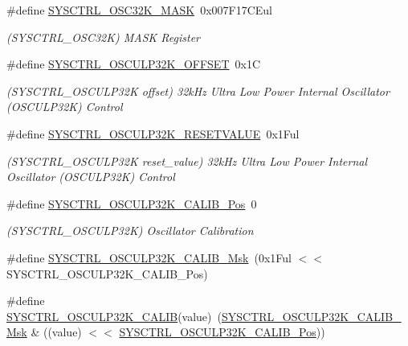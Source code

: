 \begin{DoxyCompactItemize}
\item 
\#define \mbox{\hyperlink{group___s_a_m_d21___s_y_s_c_t_r_l_ga91c37d1e1d85628f478db3078a687fdf}{S\+Y\+S\+C\+T\+R\+L\+\_\+\+O\+S\+C32\+K\+\_\+\+M\+A\+SK}}~0x007\+F17\+C\+Eul
\begin{DoxyCompactList}\small\item\em (S\+Y\+S\+C\+T\+R\+L\+\_\+\+O\+S\+C32K) M\+A\+SK Register \end{DoxyCompactList}\item 
\#define \mbox{\hyperlink{group___s_a_m_d21___s_y_s_c_t_r_l_ga3b2c2ce712e3ed40c83019159fac5023}{S\+Y\+S\+C\+T\+R\+L\+\_\+\+O\+S\+C\+U\+L\+P32\+K\+\_\+\+O\+F\+F\+S\+ET}}~0x1C
\begin{DoxyCompactList}\small\item\em (S\+Y\+S\+C\+T\+R\+L\+\_\+\+O\+S\+C\+U\+L\+P32K offset) 32k\+Hz Ultra Low Power Internal Oscillator (O\+S\+C\+U\+L\+P32K) Control \end{DoxyCompactList}\item 
\#define \mbox{\hyperlink{group___s_a_m_d21___s_y_s_c_t_r_l_ga0fb7cbf4784633291d2add8f2381771e}{S\+Y\+S\+C\+T\+R\+L\+\_\+\+O\+S\+C\+U\+L\+P32\+K\+\_\+\+R\+E\+S\+E\+T\+V\+A\+L\+UE}}~0x1\+Ful
\begin{DoxyCompactList}\small\item\em (S\+Y\+S\+C\+T\+R\+L\+\_\+\+O\+S\+C\+U\+L\+P32K reset\+\_\+value) 32k\+Hz Ultra Low Power Internal Oscillator (O\+S\+C\+U\+L\+P32K) Control \end{DoxyCompactList}\item 
\#define \mbox{\hyperlink{group___s_a_m_d21___s_y_s_c_t_r_l_ga404b197f963e0a9276bce0dbc3226207}{S\+Y\+S\+C\+T\+R\+L\+\_\+\+O\+S\+C\+U\+L\+P32\+K\+\_\+\+C\+A\+L\+I\+B\+\_\+\+Pos}}~0
\begin{DoxyCompactList}\small\item\em (S\+Y\+S\+C\+T\+R\+L\+\_\+\+O\+S\+C\+U\+L\+P32K) Oscillator Calibration \end{DoxyCompactList}\item 
\#define \mbox{\hyperlink{group___s_a_m_d21___s_y_s_c_t_r_l_gac03410fe14042d57e30885593674cea1}{S\+Y\+S\+C\+T\+R\+L\+\_\+\+O\+S\+C\+U\+L\+P32\+K\+\_\+\+C\+A\+L\+I\+B\+\_\+\+Msk}}~(0x1\+Ful $<$$<$ S\+Y\+S\+C\+T\+R\+L\+\_\+\+O\+S\+C\+U\+L\+P32\+K\+\_\+\+C\+A\+L\+I\+B\+\_\+\+Pos)
\item 
\#define \mbox{\hyperlink{group___s_a_m_d21___s_y_s_c_t_r_l_ga2132ffbdb051f365fec1d6a96dc6f91f}{S\+Y\+S\+C\+T\+R\+L\+\_\+\+O\+S\+C\+U\+L\+P32\+K\+\_\+\+C\+A\+L\+IB}}(value)~(\mbox{\hyperlink{group___s_a_m_d21___s_y_s_c_t_r_l_gac03410fe14042d57e30885593674cea1}{S\+Y\+S\+C\+T\+R\+L\+\_\+\+O\+S\+C\+U\+L\+P32\+K\+\_\+\+C\+A\+L\+I\+B\+\_\+\+Msk}} \& ((value) $<$$<$ \mbox{\hyperlink{group___s_a_m_d21___s_y_s_c_t_r_l_ga404b197f963e0a9276bce0dbc3226207}{S\+Y\+S\+C\+T\+R\+L\+\_\+\+O\+S\+C\+U\+L\+P32\+K\+\_\+\+C\+A\+L\+I\+B\+\_\+\+Pos}}))

\end{DoxyCompactItemize}
